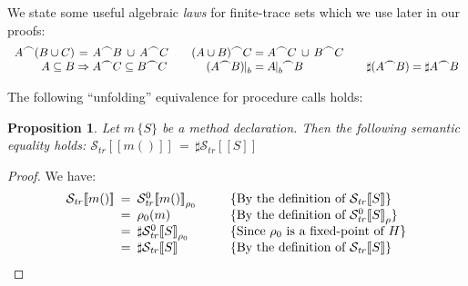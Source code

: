 \documentclass[10pt,a4paper]{amsart}
\newtheorem{proposition}[theorem]{Proposition}
\theoremstyle{definition}
\newcommand{\denot}[1]{\left[\!\left[#1\right]\!\right]}
\newcommand{\trcdenot}[1]{\mathcal{S}_{\mathit{tr}}\!\denot{#1}}
\newcommand{\trcdenoth}[1]{\mathcal{S}^0_{\mathit{tr}}\!\denot{#1}}
\newcommand{\restr}[2]{\!\!\mid_{#1}^{#2}}
\newcommand{\chop}[0]{\raisebox{1ex}{$\frown$}}
\begin{document}
We state some useful algebraic \emph{laws} for finite-trace sets which
we use later in our proofs:
%
$$
\begin{array}{r@{\;}c@{\;}l@{\qquad}r@{\;}c@{\;}l@{\qquad}r@{\;}c@{\;}l}
  A \chop (B \cup C) & = & A \chop B \>\cup\, A \chop C &
   (A \cup B) \chop C & = & A \chop C \>\cup\, B \chop C \\
   A \subseteq B & \Rightarrow & A \chop C \subseteq B \chop C & 
   (A \chop B) \restr{b}{} & = & A \restr{b}{} \!\!\chop B  &
   \sharp (A \chop B) & = & \sharp A \chop B \\     
\end{array}
$$

The following ``unfolding'' equivalence for procedure calls holds:

\begin{proposition}
\label{prop:call-unfolding-2}
Let $m\,\{S\}$ be a method declaration. Then the following semantic
equality holds:
$
  \trcdenot{m()} \,=\, \sharp \trcdenot{S} 
$
\end{proposition}

\begin{proof}%
We have:
%
$$ \begin{array}{r@{\;}c@{\;}ll}
   \trcdenot{m()} & \>=\> & \trcdenoth{m()}_{\rho_0} &~~~~~
      \{\mbox{By the definition of $\trcdenot{S}$}\} \\
   & = & \rho_0 (m) &~~~~~
      \{\mbox{By the definition of $\trcdenoth{S}_{\rho}$}\} \\
   & = & \sharp \trcdenoth{S}_{\rho_0} &~~~~~
      \{\mbox{Since $\rho_0$ is a fixed-point of $H$}\} \\
   & = & \sharp \trcdenot{S} &~~~~~
      \{\mbox{By the definition of $\trcdenot{S}$}\} \\
   \end{array} $$
\end{proof}
\end{document}
